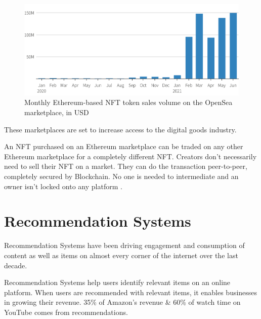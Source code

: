 \documentclass[a4paper, 12pt, oneside]{report}
\begin{document}
\begin{figure}[h!]
\centering
\includegraphics[width=12cm]{images/NFT-sales-opensea.png}
\caption{Monthly Ethereum-based NFT token sales volume on the OpenSea marketplace, in USD \autocite{howcroft_nft_2021}}
\end{figure}


These marketplaces are set to increase access to the digital goods industry.

An NFT purchased on an Ethereum marketplace can be traded on any other Ethereum marketplace for a completely different NFT. Creators don't necessarily need to sell their NFT on a market. They can do the transaction peer-to-peer, completely secured by Blockchain. No one is needed to intermediate and an owner isn't locked onto any platform \autocite{noauthor_erc-721_nodate}.




\section{Recommendation Systems}
Recommendation Systems have been driving engagement and consumption of content as well as items on almost every corner of the internet over the last decade.

\bigbreak

Recommendation Systems help users identify relevant items on an online platform. When users are recommended with relevant items, it enables businesses in growing their revenue. 35\% of Amazon’s revenue \autocite{naumov_deep_2019} \& 60\% of watch time on YouTube \autocite{noauthor_recommendations_nodate} comes from recommendations.


\end{document}
